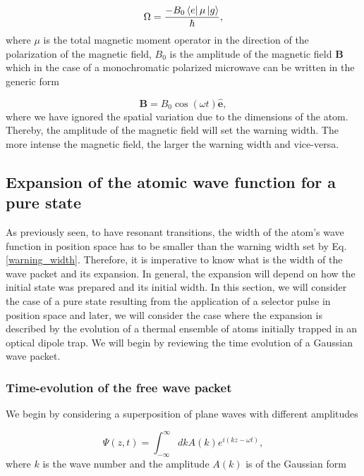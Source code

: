 \documentclass{article}
\begin{document}
\begin{equation}\label{rabi_frequency_magnetic_field}
\Omega = \frac{- B_{0} \bra{e} \mu \ket{g}}{\hbar},
\end{equation}
%
where $\mu$ is the total magnetic moment operator in the direction of the polarization of the magnetic field, $B_{0}$ is the amplitude of the magnetic field $\textbf{B}$ which in the case of a monochromatic polarized microwave can be written in the generic form

\begin{equation}
    \textbf{B} =  B_{0} \cos(\omega t) \boldsymbol{\hat{e}},
\end{equation}
%
where we have ignored the spatial variation due to the dimensions of the atom. Thereby, the amplitude of the magnetic field will set the warning width. The more intense the magnetic field, the larger the warning width and vice-versa.

\subsection{Expansion of the atomic wave function for a pure state}
As previously seen, to have resonant transitions, the width of the atom's wave function in position space has to be smaller than the warning width set by Eq. \ref{warning_width}. Therefore, it is imperative to know what is the width of the wave packet and its expansion. In general, the expansion will depend on how the initial state was prepared and its initial width. In this section, we will consider the case of a pure state resulting from the application of a selector pulse in position space and later, we will consider the case where the expansion is described by the evolution of a thermal ensemble of atoms initially trapped in an optical dipole trap. We will begin by reviewing the time evolution of a Gaussian wave packet.

\subsubsection{Time-evolution of the free wave packet}
We begin by considering a superposition of plane waves with different amplitudes \cite{gasiorowicz2003quantum}

\begin{equation}\label{free_wave_packet_momentum_space_integral}
    \Psi (z, t) =  \int_{- \infty}^{\infty} dk A(k) e^{i (kz-\omega t)} ,
\end{equation}
%
where $k$ is the wave number and the amplitude $A(k)$ is of the Gaussian form
\end{document}

